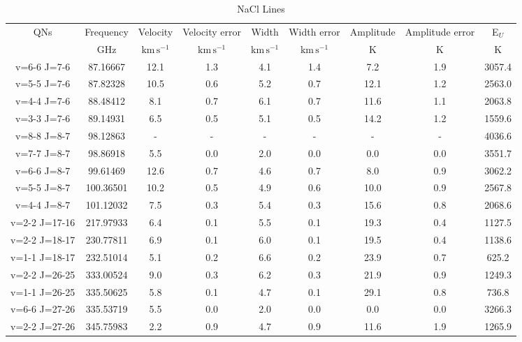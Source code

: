 \begin{table*}[htp]
\centering
\caption{NaCl Lines}
\begin{tabular}{ccccccccc}
\label{tab:NaCl_salt_lines}
QNs & Frequency & Velocity & Velocity error & Width & Width error & Amplitude & Amplitude error & E$_U$ \\
 & $\mathrm{GHz}$ & $\mathrm{km\,s^{-1}}$ & $\mathrm{km\,s^{-1}}$ & $\mathrm{km\,s^{-1}}$ & $\mathrm{km\,s^{-1}}$ & $\mathrm{K}$ & $\mathrm{K}$ & $\mathrm{K}$ \\
\hline
v=6-6 J=7-6 & 87.16667 & 12.1 & 1.3 & 4.1 & 1.4 & 7.2 & 1.9 & 3057.4 \\
v=5-5 J=7-6 & 87.82328 & 10.5 & 0.6 & 5.2 & 0.7 & 12.1 & 1.2 & 2563.0 \\
v=4-4 J=7-6 & 88.48412 & 8.1 & 0.7 & 6.1 & 0.7 & 11.6 & 1.1 & 2063.8 \\
v=3-3 J=7-6 & 89.14931 & 6.5 & 0.5 & 5.1 & 0.5 & 14.2 & 1.2 & 1559.6 \\
v=8-8 J=8-7 & 98.12863 & - & - & - & - & - & - & 4036.6 \\
v=7-7 J=8-7 & 98.86918 & 5.5 & 0.0 & 2.0 & 0.0 & 0.0 & 0.0 & 3551.7 \\
v=6-6 J=8-7 & 99.61469 & 12.6 & 0.7 & 4.6 & 0.7 & 8.0 & 0.9 & 3062.2 \\
v=5-5 J=8-7 & 100.36501 & 10.2 & 0.5 & 4.9 & 0.6 & 10.0 & 0.9 & 2567.8 \\
v=4-4 J=8-7 & 101.12032 & 7.5 & 0.3 & 5.4 & 0.3 & 15.6 & 0.8 & 2068.6 \\
v=2-2 J=17-16 & 217.97933 & 6.4 & 0.1 & 5.5 & 0.1 & 19.3 & 0.4 & 1127.5 \\
v=2-2 J=18-17 & 230.77811 & 6.9 & 0.1 & 6.0 & 0.1 & 19.5 & 0.4 & 1138.6 \\
v=1-1 J=18-17 & 232.51014 & 5.1 & 0.2 & 6.6 & 0.2 & 23.9 & 0.7 & 625.2 \\
v=2-2 J=26-25 & 333.00524 & 9.0 & 0.3 & 6.2 & 0.3 & 21.9 & 0.9 & 1249.3 \\
v=1-1 J=26-25 & 335.50625 & 5.8 & 0.1 & 4.7 & 0.1 & 29.1 & 0.8 & 736.8 \\
v=6-6 J=27-26 & 335.53719 & 5.5 & 0.0 & 2.0 & 0.0 & 0.0 & 0.0 & 3266.3 \\
v=2-2 J=27-26 & 345.75983 & 2.2 & 0.9 & 4.7 & 0.9 & 11.6 & 1.9 & 1265.9 \\
\hline
\end{tabular}

\par 
\end{table*}

